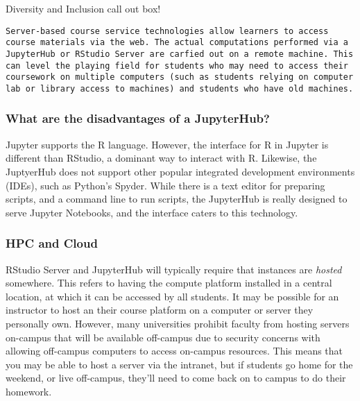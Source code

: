 {\begin{framed}
Diversity and Inclusion call out box! 
\begin{snugshade*}
\begin{lstlisting}
Server-based course service technologies allow learners to access course materials via the web. The actual computations performed via a JupyterHub or RStudio Server are carfied out on a remote machine. This can level the playing field for students who may need to access their coursework on multiple computers (such as students relying on computer lab or library access to machines) and students who have old machines.
\end{lstlisting}
\end{snugshade*}
\end{framed}}

\subsubsection{What are the disadvantages of a JupyterHub?}

Jupyter supports the R language.
However, the interface for R in Jupyter is different than RStudio, a dominant way to interact with R.
Likewise, the JuptyerHub does not support other popular integrated development environments (IDEs), such as Python's Spyder.
While there is a text editor for preparing scripts, and a command line to run scripts, the JupyterHub is really designed to serve Jupyter Notebooks, and the interface caters to this technology.



\subsubsection{HPC and Cloud}\label{HPC}

RStudio Server and JupyterHub will typically require that instances are \textit{hosted} somewhere.
This refers to having the compute platform installed in a central location, at which it can be accessed by all students.
It may be possible for an instructor to host an their course platform on a computer or server they personally own.
However, many universities prohibit faculty from hosting servers on-campus that will be available off-campus due to security concerns with allowing off-campus computers to access on-campus resources.
This means that you may be able to host a server via the intranet, but if students go home for the weekend, or live off-campus, they'll need to come back on to campus to do their homework.

